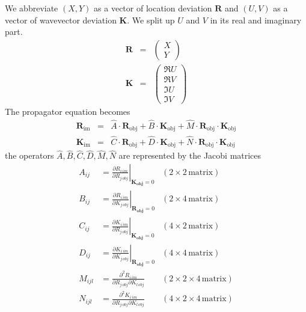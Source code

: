 \documentclass[12pt,a4paper,twoside,openright,BCOR10mm,headsepline,titlepage,abstracton,chapterprefix,final]{scrreprt}
\newcommand\Vector[1]{{\mathbf{#1}}}
\newcommand\im{\textrm{im}}
\newcommand\obj{\textrm{obj}}
\begin{document}
We abbreviate $(X,Y)$ as a vector of location deviation $\Vector{R}$
and $(U,V)$ as a vector of wavevector deviation $\Vector{K}$.
We split up $U$ and $V$ in its real and imaginary part.
\begin{subequations}
\label{eq:definition_of_parabasal_R_and_K_vectors}
\begin{eqnarray}
\Vector{R} &=&
 \begin{pmatrix}
  X \\ Y
 \end{pmatrix}
 \\
 \Vector{K} &=&
 \begin{pmatrix}
  \Re U \\ \Re V \\ \Im U \\ \Im V 
 \end{pmatrix}
\end{eqnarray}
\end{subequations}
The propagator equation becomes
\begin{subequations}
\label{eq:parabasal_imaging_equation}
\begin{eqnarray}
 \Vector{R}_\im &=& \hat{A} \cdot \Vector{R}_\obj + \hat{B} \cdot \Vector{K}_\obj + \hat{M} \cdot \Vector{R}_\obj \cdot \Vector{K}_\obj\label{eq:xyuv_imaging_equation}\\
 \Vector{K}_\im &=& \hat{C} \cdot \Vector{R}_\obj + \hat{D} \cdot \Vector{K}_\obj + \hat{N} \cdot \Vector{R}_\obj \cdot \Vector{K}_\obj
\end{eqnarray}
\end{subequations}
the operators $\hat{A},\hat{B},\hat{C},\hat{D},\hat{M},\hat{N}$ are represented by the Jacobi matrices
\begin{align}
 A_{ij} &=
   \left.
     \frac{\partial R_{i\,im}}{\partial R_{j\,obj}} 
   \right|_{\Vector{K_\obj}=0}
   & (2\times2 \,\textrm{matrix})
 \\
 B_{ij} &=
   \left.
     \frac{\partial R_{i\,im}}{\partial K_{j\,obj}} 
   \right|_{\Vector{R_\obj}=0}
   & (2\times4 \,\textrm{matrix})
 \\
 C_{ij} &=
   \left.
     \frac{\partial K_{i\,im}}{\partial R_{j\,obj}} 
   \right|_{\Vector{K_\obj}=0}
   & (4\times2 \,\textrm{matrix})
 \\
 D_{ij} &=
   \left.
     \frac{\partial K_{i\,im}}{\partial K_{j\,obj}} 
   \right|_{\Vector{R_\obj}=0}
   & (4\times4 \,\textrm{matrix})
 \\
 M_{ijl} &=
     \frac{\partial^2 R_{i\,im}}{\partial R_{j\,obj}\partial K_{l\,obj}} 
   & (2\times2\times4 \,\textrm{matrix})
 \\
 N_{ijl} &=
     \frac{\partial^2 K_{i\,im}}{\partial R_{j\,obj}\partial K_{l\,obj}} 
   & (4\times2\times4 \,\textrm{matrix})
\end{align}
\end{document}
